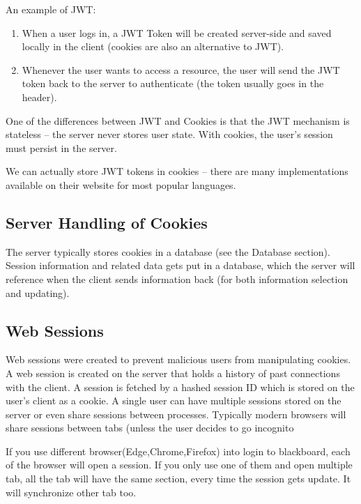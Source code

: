 \documentclass[fancy,11pt,titlestyle=display]{style/elegantbook}
\begin{document}
An example of JWT:
\begin{enumerate}
    \item When a user logs in, a JWT Token will be created server-side and saved locally in the client (cookies are also an alternative to JWT).
    \item Whenever the user wants to access a resource, the user will send the JWT token back to the server to authenticate (the token usually goes in the header).
\end{enumerate}

\par One of the differences between JWT and Cookies is that the JWT mechanism is stateless -- the server never stores user state. With cookies, the user's session must persist in the server.

\par We can actually store JWT tokens in cookies -- there are many implementations available on their website for most popular languages.

\subsection*{Server Handling of Cookies}

\par The server typically stores cookies in a database (see the Database section). Session information and related data gets put in a database, which the server will reference when the client sends information back (for both information selection and updating).

\subsection*{Web Sessions}
\par Web sessions were created to prevent malicious users from manipulating cookies. A web session is created on the server that holds a history of past connections with the client. A session is fetched by a hashed session ID which is stored on the user's client as a cookie. A single user can have multiple sessions stored on the server or even share sessions between processes. Typically modern browsers will share sessions between tabs (unless the user decides to go incognito

\par If you use different browser(Edge,Chrome,Firefox) into login to blackboard, each of the browser will open a session. If you only use one of them and open multiple tab, all the tab will have the same section, every time the session gets update. It will synchronize other tab too.
\end{document}
